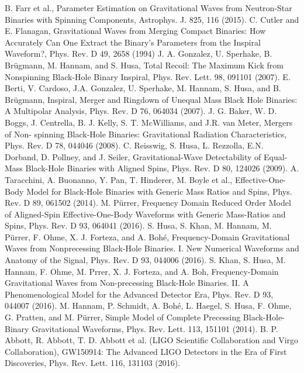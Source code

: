\documentclass[binding=0.6cm, LaM]{sapthesis}
\begin{document}
\begin{thebibliography}{500}
          B. Farr et al., Parameter Estimation on Gravitational Waves from Neutron-Star Binaries with Spinning Components, Astrophys. J. 825, 116 (2015).
    	 C. Cutler and E. Flanagan, Gravitational Waves from Merging Compact Binaries: How Accurately Can One Extract the Binary’s Parameters from the Inspiral Waveform?, Phys. Rev. D 49, 2658 (1994) 
   	 J. A. Gonzalez, U. Sperhake, B. Brügmann, M. Hannam, and S. Husa, Total Recoil: The Maximum Kick from Nonspinning Black-Hole Binary Inspiral, Phys. Rev. Lett. 98, 091101 (2007).
         E. Berti, V. Cardoso, J.A. Gonzalez, U. Sperhake, M. Hannam, S. Husa, and B. Brügmann, Inspiral, Merger and Ringdown of Unequal Mass Black Hole Binaries: A Multipolar Analysis, Phys. Rev. D 76, 064034 (2007).
          J. G. Baker, W. D. Boggs, J. Centrella, B. J. Kelly, S. T. McWilliams, and J.R. van Meter, Mergers of Non- spinning Black-Hole Binaries: Gravitational Radiation Characteristics, Phys. Rev. D 78, 044046 (2008). 
         C. Reisswig, S. Husa, L. Rezzolla, E.N. Dorband, D. Pollney, and J. Seiler, Gravitational-Wave Detectability of Equal-Mass Black-Hole Binaries with Aligned Spins, Phys. Rev. D 80, 124026 (2009). 
    	 A. Taracchini, A. Buonanno, Y. Pan, T. Hinderer, M. Boyle et al., Effective-One-Body Model for Black-Hole Binaries with Generic Mass Ratios and Spins, Phys. Rev. D 89, 061502 (2014).
          M. Pürrer, Frequency Domain Reduced Order Model of Aligned-Spin Effective-One-Body Waveforms with Generic Mass-Ratios and Spins, Phys. Rev. D 93, 064041 (2016). 
         S. Husa, S. Khan, M. Hannam, M. Pürrer, F. Ohme, X. J. Forteza, and A. Bohé, Frequency-Domain Gravitational Waves from Nonprecessing Black-Hole Binaries. I. New Numerical Waveforms and Anatomy of the Signal, Phys. Rev. D 93, 044006 (2016).
           S. Khan, S. Husa, M. Hannam, F. Ohme, M. Prrer, X. J. Forteza, and A. Boh, Frequency-Domain Gravitational Waves from Non-precessing Black-Hole Binaries. II. A Phenomenological Model for the Advanced Detector Era, Phys. Rev. D 93, 044007 (2016).
          M. Hannam, P. Schmidt, A. Bohé, L. Haegel, S. Husa, F. Ohme, G. Pratten, and M. Pürrer, Simple Model of Complete Precessing Black-Hole-Binary Gravitational Waveforms, Phys. Rev. Lett. 113, 151101 (2014).
          B. P. Abbott, R. Abbott, T. D. Abbott et al. (LIGO Scientific Collaboration and Virgo Collaboration), GW150914: The Advanced LIGO Detectors in the Era of First Discoveries, Phys. Rev. Lett. 116, 131103 (2016).

\end{thebibliography}
\end{document}
